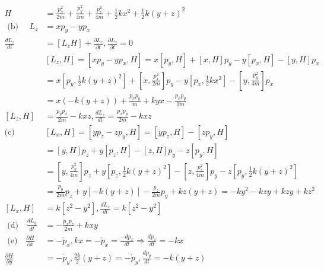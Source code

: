\begin{enumerate}
\begin{answer}
\begin{align*}
	H&=\frac{p_{x}^{2}}{2 m}+\frac{p_{y}^{2}}{4 m}+\frac{p_{z}^{2}}{4 m}+\frac{1}{2} k x^{2}+\frac{1}{2} k(y+z)^{2}\\
	\text { (b) } \quad L_{z}&=x p_{y}-y p_{x}\\
	\frac{d L_{z}}{d t}&=\left[L_{z} H\right]+\frac{\partial L_{z}}{\partial t}, \frac{\partial L_{z}}{\partial t}=0\\
	&{\left[L_{z}, H\right]=\left[x p_{y}-y p_{x}, H\right]=x\left[p_{y}, H\right]+[x, H] p_{y}-y\left[p_{x}, H\right]-[y, H] p_{x}} \\
	&=x\left[p_{y}, \frac{1}{2} k(y+z)^{2}\right]+\left[x, \frac{p_{x}^{2}}{2 m}\right] p_{y}-y\left[p_{x}, \frac{1}{2} k x^{2}\right]-\left[y, \frac{p_{y}^{2}}{4 m}\right] p_{x} \\
	&=x(-k(y+z))+\frac{p_{x} p_{y}}{m}+k y x-\frac{p_{x} p_{y}}{2 m}\\
	\left[L_{z}, H\right]&=\frac{p_{y} p_{x}}{2 m}-k x z, \frac{d L_{z}}{d t}=\frac{p_{x} p_{y}}{2 m}-k x z\\
	\text{(c)}\quad &{\left[L_{x}, H\right]=\left[y p_{z}-z p_{y}, H\right]=\left[y p_{z}, H\right]-\left[z p_{y}, H\right]} \\
	&=[y, H] p_{z}+y\left[p_{z}, H\right]-[z, H] p_{y}-z\left[p_{y}, H\right] \\
	&=\left[y, \frac{p_{y}^{2}}{4 m}\right] p_{z}+y\left[p_{z}, \frac{1}{2} k(y+z)^{2}\right]-\left[z, \frac{p_{z}^{2}}{4 m}\right] p_{y}-z\left[p_{y}, \frac{1}{2} k(y+z)^{2}\right] \\
	&=\frac{p_{y}}{2 m} p_{z}+y[-k(y+z)]-\frac{p_{z}}{2 m} p_{y}+k z(y+z)=-k y^{2}-k z y+k z y+k z^{2}\\
	\left[L_{x}, H\right]&=k\left[z^{2}-y^{2}\right], \frac{d L_{x}}{d t}=k\left[z^{2}-y^{2}\right]\\
\text{	(d)}\quad 
	\frac{d L_{y}}{d t}&=-\frac{p_{x} p_{z}}{2 m}+k x y\\
\text{	(e)}\quad 
	\frac{\partial H}{\partial x}&=-\dot{p}_{x}, k x=-\dot{p}_{x}=\frac{-d p_{x}}{d t} \Rightarrow \frac{d p_{x}}{d t}=-k x\\
	\frac{\partial H}{\partial y}&=-\dot{p}_{y}, \frac{2 k}{2}(y+z)=-\dot{p}_{y}, \frac{d p_{y}}{d t}=-k(y+z)
	\end{align*}
\end{answer}
\end{enumerate}
